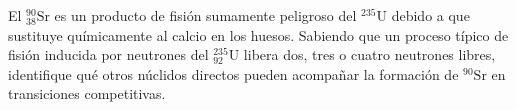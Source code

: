\item El $^{90}_{38}\text{Sr}$ es un producto de fisión sumamente peligroso del $^{235}\text{U}$ debido a que sustituye químicamente al calcio en los huesos. Sabiendo que un proceso típico de fisión inducida por neutrones del $^{235}_{92}\text{U}$ libera dos, tres o cuatro neutrones libres, identifique qué otros núclidos directos pueden acompañar la formación de $^{90}\text{Sr}$ en transiciones competitivas.